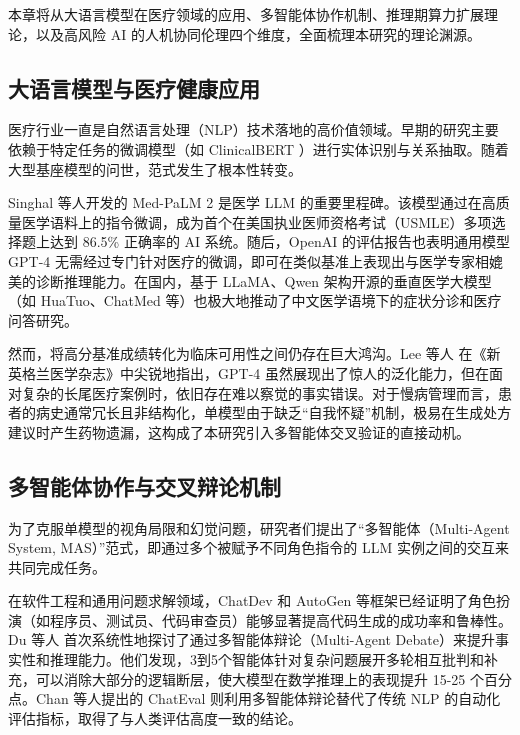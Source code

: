 \documentclass[11pt,a4paper]{ctexart}
\begin{document}
本章将从大语言模型在医疗领域的应用、多智能体协作机制、推理期算力扩展理论，以及高风险 AI 的人机协同伦理四个维度，全面梳理本研究的理论渊源。

\subsection{大语言模型与医疗健康应用}

医疗行业一直是自然语言处理（NLP）技术落地的高价值领域。早期的研究主要依赖于特定任务的微调模型（如 ClinicalBERT \cite{alsentzer2019public}）进行实体识别与关系抽取。随着大型基座模型的问世，范式发生了根本性转变。

Singhal 等人开发的 Med-PaLM 2 \cite{singhal2023medpalm} 是医学 LLM 的重要里程碑。该模型通过在高质量医学语料上的指令微调，成为首个在美国执业医师资格考试（USMLE）多项选择题上达到 86.5\% 正确率的 AI 系统。随后，OpenAI 的评估报告也表明通用模型 GPT-4 \cite{nori2023capabilities} 无需经过专门针对医疗的微调，即可在类似基准上表现出与医学专家相媲美的诊断推理能力。在国内，基于 LLaMA、Qwen 架构开源的垂直医学大模型（如 HuaTuo、ChatMed 等）也极大地推动了中文医学语境下的症状分诊和医疗问答研究。

然而，将高分基准成绩转化为临床可用性之间仍存在巨大鸿沟。Lee 等人 \cite{lee2023benefits} 在《新英格兰医学杂志》中尖锐地指出，GPT-4 虽然展现出了惊人的泛化能力，但在面对复杂的长尾医疗案例时，依旧存在难以察觉的事实错误。对于慢病管理而言，患者的病史通常冗长且非结构化，单模型由于缺乏“自我怀疑”机制，极易在生成处方建议时产生药物遗漏，这构成了本研究引入多智能体交叉验证的直接动机。

\subsection{多智能体协作与交叉辩论机制}

为了克服单模型的视角局限和幻觉问题，研究者们提出了“多智能体（Multi-Agent System, MAS）”范式，即通过多个被赋予不同角色指令的 LLM 实例之间的交互来共同完成任务。

在软件工程和通用问题求解领域，ChatDev \cite{qian2023communicative} 和 AutoGen 等框架已经证明了角色扮演（如程序员、测试员、代码审查员）能够显著提高代码生成的成功率和鲁棒性。Du 等人 \cite{du2024improving} 首次系统性地探讨了通过多智能体辩论（Multi-Agent Debate）来提升事实性和推理能力。他们发现，3到5个智能体针对复杂问题展开多轮相互批判和补充，可以消除大部分的逻辑断层，使大模型在数学推理上的表现提升 15-25 个百分点。Chan 等人提出的 ChatEval \cite{chan2024chateval} 则利用多智能体辩论替代了传统 NLP 的自动化评估指标，取得了与人类评估高度一致的结论。
\end{document}
